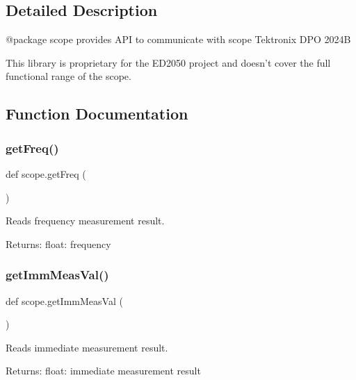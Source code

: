 \subsection{Detailed Description}
\begin{DoxyVerb}@package scope
provides API to communicate with scope Tektronix DPO 2024B

This library is proprietary for the ED2050 project and doesn't cover 
the full functional range of the scope.
\end{DoxyVerb}
 

\subsection{Function Documentation}
\mbox{\label{namespacescope_a8962dd320b83664d5fd27c515a23294e}} 
\subsubsection{\texorpdfstring{get\+Freq()}{getFreq()}}
{\footnotesize\ttfamily def scope.\+get\+Freq (\begin{DoxyParamCaption}{ }\end{DoxyParamCaption})}

\begin{DoxyVerb}Reads frequency measurement result.

Returns:
    float: frequency\end{DoxyVerb}
 \mbox{\label{namespacescope_af9a59b27c9ee6359953c89975cb56be5}} 
\subsubsection{\texorpdfstring{get\+Imm\+Meas\+Val()}{getImmMeasVal()}}
{\footnotesize\ttfamily def scope.\+get\+Imm\+Meas\+Val (\begin{DoxyParamCaption}{ }\end{DoxyParamCaption})}

\begin{DoxyVerb}Reads immediate measurement result.

Returns:
    float: immediate measurement result
\end{DoxyVerb}
 \mbox{\label{namespacescope_a21fd73ed4fae6c56f2f02fe78cf14741}} 
